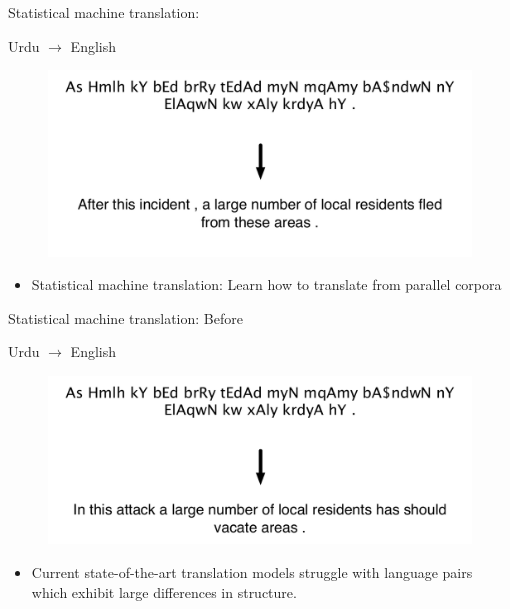\documentclass{beamer}
\begin{document}
\begin{frame}[t]{Statistical machine translation: }
\begin{exampleblock}{Urdu $\rightarrow$ English}
  \begin{figure}
    {\centering \includegraphics[scale=0.55]{urdu-ref.pdf}}
  \end{figure}
\end{exampleblock}
\begin{itemize}
  \item Statistical machine translation: Learn how to translate from parallel corpora 
\end{itemize}
\end{frame}

\begin{frame}[t]{Statistical machine translation: Before}
\begin{exampleblock}{Urdu $\rightarrow$ English}
  \begin{figure}
    {\centering \includegraphics[scale=0.55]{urdu-bl.pdf}}
  \end{figure}
\end{exampleblock}
\begin{itemize}
  \item Current state-of-the-art translation models struggle with language pairs which exhibit large differences in structure.
\end{itemize}
\end{frame}
\end{document}
